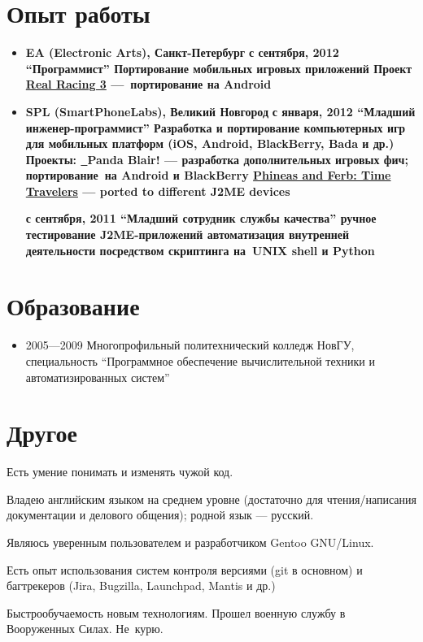 \section{Опыт работы}
\begin{itemize}
\item {
\fontsize{14pt}{14pt}\selectfont
\bfseries EA (Electronic Arts)\mdseries, Санкт-Петербург
}
\subitem \bfseries с сентября, 2012 ``Программист''\mdseries
\subsubitem Портирование мобильных игровых приложений
\subsubitem Проект \href{http://www.facebook.com/realracing}{Real Racing 3} ---\
портирование на Android

\item {
\fontsize{14pt}{14pt}\selectfont
\bfseries SPL (SmartPhoneLabs)\mdseries, Великий Новгород
}
\subitem \bfseries с января, 2012 ``Младший инженер-программист''\mdseries
\subsubitem Разработка и портирование компьютерных игр для мобильных платформ
(iOS, Android, BlackBerry, Bada и др.)
\subsubitem Проекты:
\subsubitem\href{https://itunes.apple.com/us/app/panda-blair!/id500995558?mt=8}\
{Panda Blair!} --- разработка дополнительных игровых фич; портирование\
на Android и BlackBerry
\subsubitem\href{http://java.mob.org/game/phineas\_and\_ferb\_time\_travelers.\
html}{Phineas and Ferb: Time Travelers} --- ported to different J2ME devices

\subitem \bfseries с сентября, 2011 ``Младший сотрудник службы качества''
\mdseries
\subsubitem ручное тестирование J2ME-приложений
\subsubitem автоматизация внутренней деятельности посредством скриптинга на\
UNIX shell и Python
\end{itemize}

\section{Образование}
\begin{itemize}
\item 2005---2009 Многопрофильный политехнический колледж НовГУ, специальность
``Программное обеспечение вычислительной техники и автоматизированных систем''
\end{itemize}

\section{Другое}
Есть умение понимать и изменять чужой код.

Владею английским языком на среднем уровне (достаточно для чтения/написания
документации и делового общения); родной язык --- русский.

Являюсь уверенным пользователем и разработчиком Gentoo GNU/Linux.

Есть опыт использования систем контроля версиями (git в основном) и
багтрекеров (Jira, Bugzilla, Launchpad, Mantis и др.)

Быстрообучаемость новым технологиям.
Прошел военную службу в Вооруженных Силах.
Не~курю.
